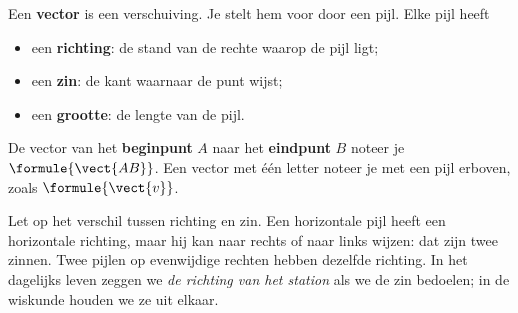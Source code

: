 \begin{theorie}
\begin{minipage}[t]{.64\linewidth}
\vspace{0pt}
Een \textbf{\textcolor{accent}{vector}} is een verschuiving. Je stelt hem voor door een pijl. Elke pijl heeft
\begin{itemize}[nosep,leftmargin=5mm]
\item een \textbf{\textcolor{accent}{richting}}: de stand van de rechte waarop de pijl ligt;
\item een \textbf{\textcolor{accent}{zin}}: de kant waarnaar de punt wijst;
\item een \textbf{\textcolor{accent}{grootte}}: de lengte van de pijl.
\end{itemize}
De vector van het \textbf{\textcolor{accent}{beginpunt}} $A$ naar het \textbf{\textcolor{accent}{eindpunt}} $B$ noteer je $\formule{\vect{AB}}$. Een vector met één letter noteer je met een pijl erboven, zoals $\formule{\vect{v}}$.
\end{minipage}\hfill
\begin{minipage}[t]{.32\linewidth}
\vspace{4mm}
\centering
{}
\end{minipage}
\end{theorie}

Let op het verschil tussen richting en zin. Een horizontale pijl heeft een horizontale richting, maar hij kan naar rechts of naar links wijzen: dat zijn twee zinnen. Twee pijlen op evenwijdige rechten hebben dezelfde richting. In het dagelijks leven zeggen we \textit{de richting van het station} als we de zin bedoelen; in de wiskunde houden we ze uit elkaar.

